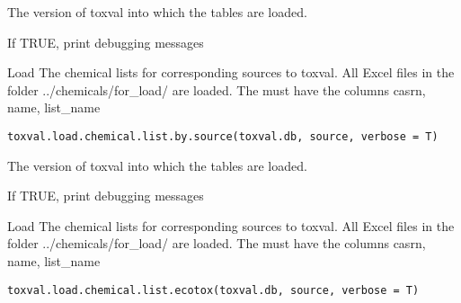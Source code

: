 \documentclass[letterpaper]{book}
\begin{document}
%
\begin{Arguments}
\begin{ldescription}
\item[\code{toxval.db}] The version of toxval into which the tables are loaded.

\item[\code{verbose}] If TRUE, print debugging messages
\end{ldescription}
\end{Arguments}
%
\begin{Description}\relax
Load The chemical lists for corresponding sources to toxval. All Excel files in the folder ../chemicals/for\_load/
are loaded. The must have the columns casrn, name, list\_name
\end{Description}
%
\begin{Usage}
\begin{verbatim}
toxval.load.chemical.list.by.source(toxval.db, source, verbose = T)
\end{verbatim}
\end{Usage}
%
\begin{Arguments}
\begin{ldescription}
\item[\code{toxval.db}] The version of toxval into which the tables are loaded.

\item[\code{verbose}] If TRUE, print debugging messages
\end{ldescription}
\end{Arguments}
%
\begin{Description}\relax
Load The chemical lists for corresponding sources to toxval. All Excel files in the folder ../chemicals/for\_load/
are loaded. The must have the columns casrn, name, list\_name
\end{Description}
%
\begin{Usage}
\begin{verbatim}
toxval.load.chemical.list.ecotox(toxval.db, source, verbose = T)
\end{verbatim}
\end{Usage}
\end{document}
